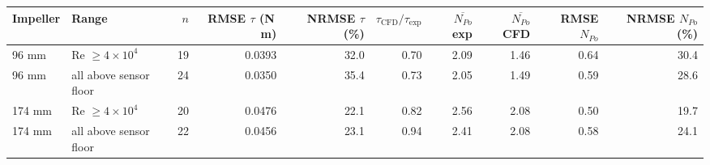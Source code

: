 \begin{tabular}{@{}llrrrrrrrr@{}}
\toprule
Impeller & Range & $n$ & RMSE $\tau$ (N\,m) & NRMSE $\tau$ (\%) & $\tau_{\mathrm{CFD}}/\tau_{\mathrm{exp}}$ & $\overline{N_{Po}}$ exp & $\overline{N_{Po}}$ CFD & RMSE $N_{Po}$ & NRMSE $N_{Po}$ (\%) \\
\midrule
96 mm & Re $\geq 4\times10^{4}$ & 19 & 0.0393 & 32.0 & 0.70 & 2.09 & 1.46 & 0.64 & 30.4 \\
96 mm & all above sensor floor & 24 & 0.0350 & 35.4 & 0.73 & 2.05 & 1.49 & 0.59 & 28.6 \\
174 mm & Re $\geq 4\times10^{4}$ & 20 & 0.0476 & 22.1 & 0.82 & 2.56 & 2.08 & 0.50 & 19.7 \\
174 mm & all above sensor floor & 22 & 0.0456 & 23.1 & 0.94 & 2.41 & 2.08 & 0.58 & 24.1 \\
\bottomrule
\end{tabular}
